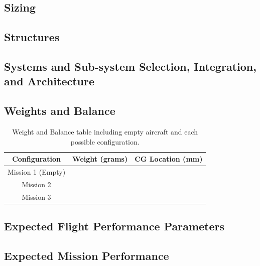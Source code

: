 \documentclass[report]{byu-aero}
\begin{document}
\subsection{Sizing}
\label{ssec:sizing}




\subsection{Structures}
\label{ssec:structures}




\subsection{Systems and Sub-system Selection, Integration, and Architecture}
\label{ssec:systemdetails}




\subsection{Weights and Balance}
\label{ssec:weightsandbalance}


\begin{table}[h!]
	\centering
	\caption{Weight and Balance table including empty aircraft and each possible configuration.}
	\label{tab:wieghtsandbalance}
	\begin{tabular}{ |c|c|c| } 
		\hline
		\rowcolor{BYUbluemid}
    	Configuration & Weight (grams) & CG Location (mm) \\
		\hline
	    Mission 1 (Empty) &  &  \\
		\hline
		Mission 2 &  &  \\
		\hline
		Mission 3 &  &  \\
		\hline
	\end{tabular}
\end{table}



\subsection{Expected Flight Performance Parameters}
\label{ssec:flightperformanceparams}




\subsection{Expected Mission Performance}
\label{ssec:missionperformance}
\end{document}
